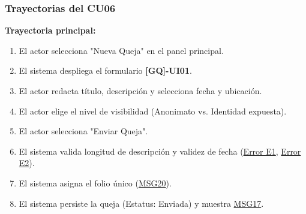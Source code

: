 \begin{appendices}
\subsubsection{Trayectorias del CU06}
\textbf{Trayectoria principal:}
\begin{enumerate}[nosep]
    \item El actor selecciona "Nueva Queja" en el panel principal.
    \item El sistema despliega el formulario \textbf{[GQ]-UI01}.
    \item El actor redacta título, descripción y selecciona fecha y ubicación.
    \item El actor elige el nivel de visibilidad (Anonimato vs. Identidad expuesta).
    \item El actor selecciona "Enviar Queja".
    \item El sistema valida longitud de descripción y validez de fecha (\hyperlink{err:E10}{Error E1}, \hyperlink{err:E11}{Error E2}).
    \item El sistema asigna el folio único (\hyperlink{msg:MSG20}{MSG20}).
    \item El sistema persiste la queja (Estatus: Enviada) y muestra \hyperlink{msg:MSG17}{MSG17}.
\end{enumerate}


\end{appendices}
